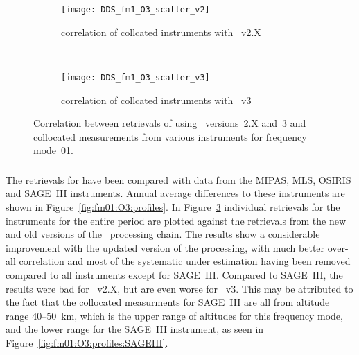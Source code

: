 \begin{figure}[htpb]
    \centering
    \begin{subfigure}[b]{0.49\textwidth}
        \texttt{[image: DDS\_fm1\_O3\_scatter\_v2]}
        \caption{correlation of collcated instruments with \smr~v2.X}
        \label{fig:fm01:O3:scatter:v2}
    \end{subfigure}
    \,
    \begin{subfigure}[b]{0.49\textwidth}
        \texttt{[image: DDS\_fm1\_O3\_scatter\_v3]}
        \caption{correlation of collcated instruments with \smr~v3}
        \label{fig:fm01:O3:scatter:v3}
    \end{subfigure}
    \caption{Correlation between retrievals of  using \smr\
    versions~2.X and~3 and collocated measurements from various instruments
    for frequency mode~01.}
    \label{fig:fm01:O3:scatter}
\end{figure}

\subsubsection{}
\label{sec:fm01:comparison:O3}
The retrievals for \chem{O_3} have been compared with data from the MIPAS, MLS,
OSIRIS and SAGE~III instruments. Annual average differences to these
instruments are shown in Figure~\ref{fig:fm01:O3:profiles}. In
Figure~\ref{fig:fm01:O3:scatter} individual retrievals for the instruments for
the entire period are plotted against the retrievals from the new and old
versions of the \smr\ processing chain. The results show a considerable
improvement with the updated version of the processing, with much better
over-all correlation and most of the systematic under estimation having been
removed compared to all instruments except for SAGE~III. Compared to SAGE~III,
the results were bad for \smr~v2.X, but are even worse for \smr~v3. This may be
attributed to the fact that the collocated measurments for SAGE~III are all
from altitude range $40$--$50$~km, which is the upper range of altitudes for
this frequency mode, and the lower range for the SAGE~III instrument, as seen
in Figure~\ref{fig:fm01:O3:profiles:SAGEIII}.



